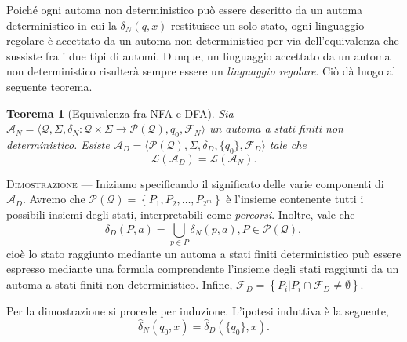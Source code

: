\documentclass[10pt]{\classname}
\newtheorem{thm}{Teorema}
\theoremstyle{definition}
\theoremstyle{definition}
\theoremstyle{definition}
\theoremstyle{definition}
\begin{document}
\clearpage

Poiché ogni automa non deterministico può essere descritto da un automa
deterministico in cui la $\delta_N(q, x)$ restituisce un solo stato, ogni
linguaggio regolare è accettato da un automa non deterministico per via
dell'equivalenza che sussiste fra i due tipi di automi. Dunque, un linguaggio
accettato da un automa non deterministico risulterà sempre essere
un \emph{linguaggio regolare}. Ciò dà luogo al seguente teorema.

\begin{thm}[Equivalenza fra NFA e DFA]
    Sia $\mathcal A_N = \langle \mathcal Q, \Sigma, \delta_N : \mathcal Q \times \Sigma \rightarrow \mathcal P ( \mathcal Q ), q_0, \mathcal F_N \rangle$ un automa a stati finiti non deterministico. Esiste $\mathcal A_D = \langle \mathcal P ( \mathcal Q ), \Sigma, \delta_D, \{q_0\}, \mathcal F_D \rangle$ tale che \[\mathcal L (\mathcal A_D) = \mathcal L (\mathcal A_N).\]
\end{thm}

\textsc{Dimostrazione} --- Iniziamo specificando il significato delle varie componenti di $\mathcal A_D$. Avremo che $\mathcal P (\mathcal Q) = \left\{P_1, P_2, \dots, P_{2^m}\right\}$ è l'insieme contenente tutti i possibili insiemi degli stati, interpretabili come \emph{percorsi}. Inoltre, vale che \[\delta_D (P, a) = \bigcup_{p \in P} \delta_N(p, a), P \in \mathcal P ( \mathcal Q),\] cioè lo stato raggiunto mediante un automa a stati finiti deterministico può essere espresso mediante una formula comprendente l'insieme degli stati raggiunti da un automa a stati finiti non deterministico. Infine, $\mathcal F_D = \left\{P_i | P_i \cap \mathcal F_D \neq \emptyset\right\}$.

Per la dimostrazione si procede per induzione. L'ipotesi induttiva è la seguente, \[\hat \delta_N (q_0, x) = \hat \delta_D(\{q_0\}, x).\]
\end{document}
